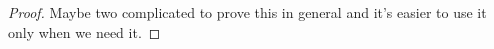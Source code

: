 \begin{proof}

Maybe two complicated to prove this in general and it's easier to use it only when we need it.









\end{proof}

